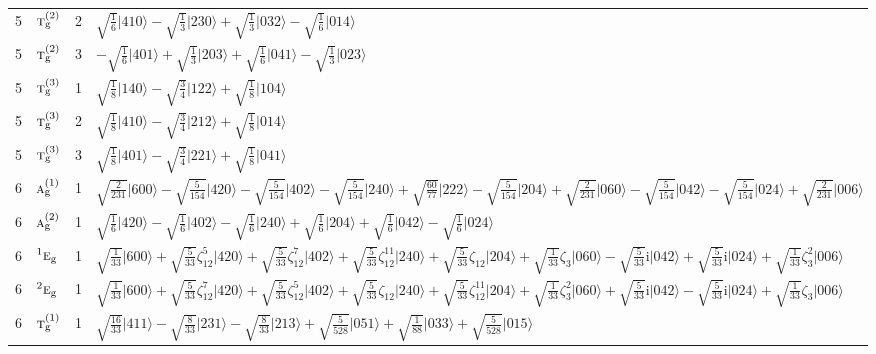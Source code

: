 \documentclass[11pt]{article}
\newcommand{\irr}[1]{\text{\normalfont\scshape #1}}
\newcommand{\conjpair}[1]{{}^{#1}}
\newcommand{\ptag}[1]{\mathrm{#1}}
\newcommand{\iunit}{\mathrm{i}}
\newcommand{\rootunity}[1]{\zeta_{#1}}
\newcommand{\occ}[1]{\lvert #1\rangle}
\begin{document}
\begin{longtable}{c l c p{}}
5 & $\irr{t}_{\ptag{g}}^{(2)}$ & 2 & $\sqrt{\tfrac{1}{6}}\occ{410}-\sqrt{\tfrac{1}{3}}\occ{230}+\sqrt{\tfrac{1}{3}}\occ{032}-\sqrt{\tfrac{1}{6}}\occ{014}$\\
5 & $\irr{t}_{\ptag{g}}^{(2)}$ & 3 & $-\sqrt{\tfrac{1}{6}}\occ{401}+\sqrt{\tfrac{1}{3}}\occ{203}+\sqrt{\tfrac{1}{6}}\occ{041}-\sqrt{\tfrac{1}{3}}\occ{023}$\\
5 & $\irr{t}_{\ptag{g}}^{(3)}$ & 1 & $\sqrt{\tfrac{1}{8}}\occ{140}-\sqrt{\tfrac{3}{4}}\occ{122}+\sqrt{\tfrac{1}{8}}\occ{104}$\\
5 & $\irr{t}_{\ptag{g}}^{(3)}$ & 2 & $\sqrt{\tfrac{1}{8}}\occ{410}-\sqrt{\tfrac{3}{4}}\occ{212}+\sqrt{\tfrac{1}{8}}\occ{014}$\\
5 & $\irr{t}_{\ptag{g}}^{(3)}$ & 3 & $\sqrt{\tfrac{1}{8}}\occ{401}-\sqrt{\tfrac{3}{4}}\occ{221}+\sqrt{\tfrac{1}{8}}\occ{041}$\\
\hline
6 & $\irr{a}_{\ptag{g}}^{(1)}$ & 1 & $\sqrt{\tfrac{2}{231}}\occ{600}-\sqrt{\tfrac{5}{154}}\occ{420}-\sqrt{\tfrac{5}{154}}\occ{402}-\sqrt{\tfrac{5}{154}}\occ{240}+\sqrt{\tfrac{60}{77}}\occ{222}-\sqrt{\tfrac{5}{154}}\occ{204}+\sqrt{\tfrac{2}{231}}\occ{060}-\sqrt{\tfrac{5}{154}}\occ{042}-\sqrt{\tfrac{5}{154}}\occ{024}+\sqrt{\tfrac{2}{231}}\occ{006}$\\
6 & $\irr{a}_{\ptag{g}}^{(2)}$ & 1 & $\sqrt{\tfrac{1}{6}}\occ{420}-\sqrt{\tfrac{1}{6}}\occ{402}-\sqrt{\tfrac{1}{6}}\occ{240}+\sqrt{\tfrac{1}{6}}\occ{204}+\sqrt{\tfrac{1}{6}}\occ{042}-\sqrt{\tfrac{1}{6}}\occ{024}$\\
6 & $\conjpair{1}\irr{e}_{\ptag{g}}$ & 1 & $\sqrt{\tfrac{1}{33}}\occ{600}+\sqrt{\tfrac{5}{33}}\rootunity{12}^{5}\occ{420}+\sqrt{\tfrac{5}{33}}\rootunity{12}^{7}\occ{402}+\sqrt{\tfrac{5}{33}}\rootunity{12}^{11}\occ{240}+\sqrt{\tfrac{5}{33}}\rootunity{12}\occ{204}+\sqrt{\tfrac{1}{33}}\rootunity{3}\occ{060}-\sqrt{\tfrac{5}{33}}\iunit\occ{042}+\sqrt{\tfrac{5}{33}}\iunit\occ{024}+\sqrt{\tfrac{1}{33}}\rootunity{3}^{2}\occ{006}$\\
6 & $\conjpair{2}\irr{e}_{\ptag{g}}$ & 1 & $\sqrt{\tfrac{1}{33}}\occ{600}+\sqrt{\tfrac{5}{33}}\rootunity{12}^{7}\occ{420}+\sqrt{\tfrac{5}{33}}\rootunity{12}^{5}\occ{402}+\sqrt{\tfrac{5}{33}}\rootunity{12}\occ{240}+\sqrt{\tfrac{5}{33}}\rootunity{12}^{11}\occ{204}+\sqrt{\tfrac{1}{33}}\rootunity{3}^{2}\occ{060}+\sqrt{\tfrac{5}{33}}\iunit\occ{042}-\sqrt{\tfrac{5}{33}}\iunit\occ{024}+\sqrt{\tfrac{1}{33}}\rootunity{3}\occ{006}$\\
6 & $\irr{t}_{\ptag{g}}^{(1)}$ & 1 & $\sqrt{\tfrac{16}{33}}\occ{411}-\sqrt{\tfrac{8}{33}}\occ{231}-\sqrt{\tfrac{8}{33}}\occ{213}+\sqrt{\tfrac{5}{528}}\occ{051}+\sqrt{\tfrac{1}{88}}\occ{033}+\sqrt{\tfrac{5}{528}}\occ{015}$\\

\end{longtable}
\end{document}
